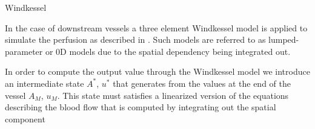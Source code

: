 \documentclass[a4paper, oneside]{discothesis}
\begin{document}
Windkessel

In the case of downstream vessels a three element Windkessel model is applied to simulate the perfusion as described in \cite{CiCP-4-317}.
Such models are referred to as lumped-parameter or 0D models due to the spatial dependency being integrated out.

In order to compute the output value through the Windkessel model we introduce an intermediate state $A^*$, $u^*$ that generates from the values at the end of the vessel $A_M$, $u_M$.
This state must satisfies a linearized version of the equations describing the blood flow that is computed by integrating out the spatial component

\end{document}
